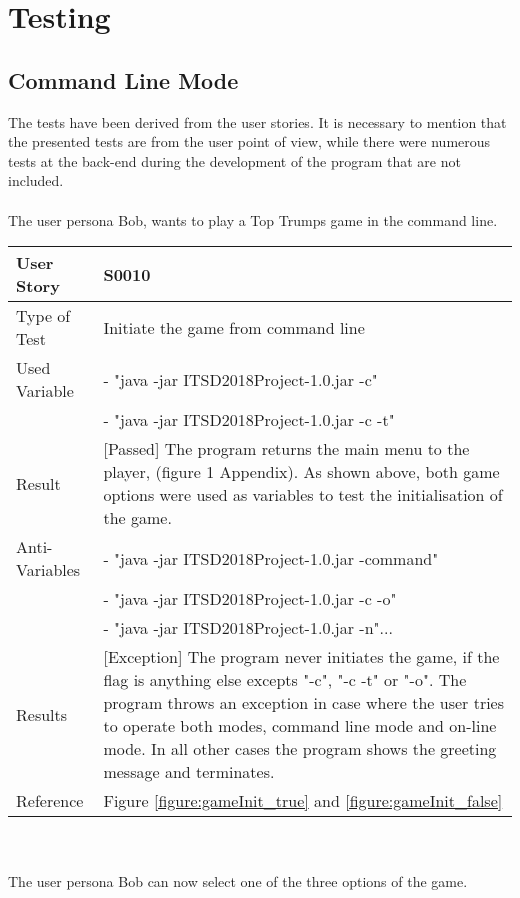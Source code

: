 \newpage
\section{Testing}
\subsection{Command Line Mode}
The tests have been derived from the user stories. It is necessary to mention that the presented tests are from the user point of view, while there were numerous tests at the back-end during the development of the program that are not included. \\
\vspace{0.1cm}\\
The user persona Bob, wants to play a Top Trumps game in the command line.    
\vspace{0.2cm}\\
\begin{tabular}{l | p{12cm}}
User Story & \textbf{S0010} \\
\hline
Type of Test & Initiate the game from command line\\
\hline
Used Variable & 
 - "java -jar ITSD2018Project-1.0.jar -c" \\
 & 
 - "java -jar ITSD2018Project-1.0.jar -c -t"
\\
\hline
Result & [Passed] The program returns the main menu to the player, (figure 1 Appendix). As shown above, both game options were used as variables to test the initialisation of the game.\\ 
\hline
Anti-Variables & - "java -jar ITSD2018Project-1.0.jar -command"\\
& - "java -jar ITSD2018Project-1.0.jar -c -o"\\
& - "java -jar ITSD2018Project-1.0.jar -n"...\\
\hline
Results & [Exception] The program never initiates the game, if the flag is anything else excepts "-c", "-c -t" or "-o". The program throws an exception in case where the user tries to operate both modes, command line mode and on-line mode. In all other cases the program shows the greeting message and terminates.\\
\hline
Reference & Figure \ref{figure:gameInit_true} and \ref{figure:gameInit_false}\\ \hline 
\end{tabular}\\
\vspace{0.2cm}\\ 
The user persona Bob can now select one of the three options of the game.\\
